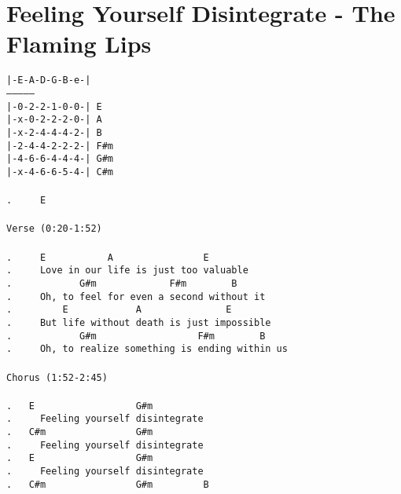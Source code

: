 \newpage
\section{Feeling Yourself Disintegrate - The Flaming Lips}
\label{Feeling Yourself Disintegrate - The Flaming Lips}
\texttt{|-E-A-D-G-B-e-|\\
---------------\\
|-0-2-2-1-0-0-|\ E\\
|-x-0-2-2-2-0-|\ A\\
|-x-2-4-4-4-2-|\ B\\
|-2-4-4-2-2-2-|\ F\#m\\
|-4-6-6-4-4-4-|\ G\#m\\
|-x-4-6-6-5-4-|\ C\#m\\
\\
.\ \ \ \ \ E\\
\\
Verse\ (0:20-1:52)\\
\\
.\ \ \ \ \ E\ \ \ \ \ \ \ \ \ \ \ A\ \ \ \ \ \ \ \ \ \ \ \ \ \ \ \ E\\
.\ \ \ \ \ Love\ in\ our\ life\ is\ just\ too\ valuable\\
.\ \ \ \ \ \ \ \ \ \ \ \ G\#m\ \ \ \ \ \ \ \ \ \ \ \ \ F\#m\ \ \ \ \ \ \ \ B\\
.\ \ \ \ \ Oh,\ to\ feel\ for\ even\ a\ second\ without\ it\\
.\ \ \ \ \ \ \ \ \ E\ \ \ \ \ \ \ \ \ \ \ \ A\ \ \ \ \ \ \ \ \ \ \ \ \ \ \ E\\
.\ \ \ \ \ But\ life\ without\ death\ is\ just\ impossible\\
.\ \ \ \ \ \ \ \ \ \ \ \ G\#m\ \ \ \ \ \ \ \ \ \ \ \ \ \ \ \ \ \ F\#m\ \ \ \ \ \ \ \ B\\
.\ \ \ \ \ Oh,\ to\ realize\ something\ is\ ending\ within\ us\\
\\
Chorus\ (1:52-2:45)\\
\\
.\ \ \ E\ \ \ \ \ \ \ \ \ \ \ \ \ \ \ \ \ \ G\#m\\
.\ \ \ \ \ Feeling\ yourself\ disintegrate\\
.\ \ \ C\#m\ \ \ \ \ \ \ \ \ \ \ \ \ \ \ \ G\#m\\
.\ \ \ \ \ Feeling\ yourself\ disintegrate\\
.\ \ \ E\ \ \ \ \ \ \ \ \ \ \ \ \ \ \ \ \ \ G\#m\\
.\ \ \ \ \ Feeling\ yourself\ disintegrate\\
.\ \ \ C\#m\ \ \ \ \ \ \ \ \ \ \ \ \ \ \ \ G\#m\ \ \ \ \ \ \ \ \ B\\
}
